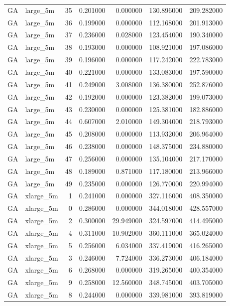\begin{tabular}{llrrrrr}
GA & large_5m & 35 & 0.201000 & 0.000000 & 130.896000 & 209.282000 \\
GA & large_5m & 36 & 0.199000 & 0.000000 & 112.168000 & 201.913000 \\
GA & large_5m & 37 & 0.236000 & 0.028000 & 123.454000 & 190.340000 \\
GA & large_5m & 38 & 0.193000 & 0.000000 & 108.921000 & 197.086000 \\
GA & large_5m & 39 & 0.196000 & 0.000000 & 117.242000 & 222.783000 \\
GA & large_5m & 40 & 0.221000 & 0.000000 & 133.083000 & 197.590000 \\
GA & large_5m & 41 & 0.249000 & 3.008000 & 136.380000 & 252.876000 \\
GA & large_5m & 42 & 0.192000 & 0.000000 & 123.382000 & 199.073000 \\
GA & large_5m & 43 & 0.230000 & 0.000000 & 125.381000 & 182.886000 \\
GA & large_5m & 44 & 0.607000 & 2.010000 & 149.304000 & 218.793000 \\
GA & large_5m & 45 & 0.208000 & 0.000000 & 113.932000 & 206.964000 \\
GA & large_5m & 46 & 0.238000 & 0.000000 & 148.375000 & 234.880000 \\
GA & large_5m & 47 & 0.256000 & 0.000000 & 135.104000 & 217.170000 \\
GA & large_5m & 48 & 0.189000 & 0.871000 & 117.180000 & 213.966000 \\
GA & large_5m & 49 & 0.235000 & 0.000000 & 126.770000 & 220.994000 \\
GA & xlarge_5m & 1 & 0.241000 & 0.000000 & 327.116000 & 408.350000 \\
GA & xlarge_5m & 0 & 0.286000 & 0.000000 & 344.018000 & 428.557000 \\
GA & xlarge_5m & 2 & 0.300000 & 29.949000 & 324.597000 & 414.495000 \\
GA & xlarge_5m & 4 & 0.311000 & 10.902000 & 360.111000 & 365.024000 \\
GA & xlarge_5m & 5 & 0.256000 & 6.034000 & 337.419000 & 416.265000 \\
GA & xlarge_5m & 3 & 0.246000 & 7.724000 & 336.273000 & 406.184000 \\
GA & xlarge_5m & 6 & 0.268000 & 0.000000 & 319.265000 & 400.354000 \\
GA & xlarge_5m & 9 & 0.258000 & 12.560000 & 348.745000 & 403.705000 \\
GA & xlarge_5m & 8 & 0.244000 & 0.000000 & 339.981000 & 393.819000 \\

\end{tabular}
